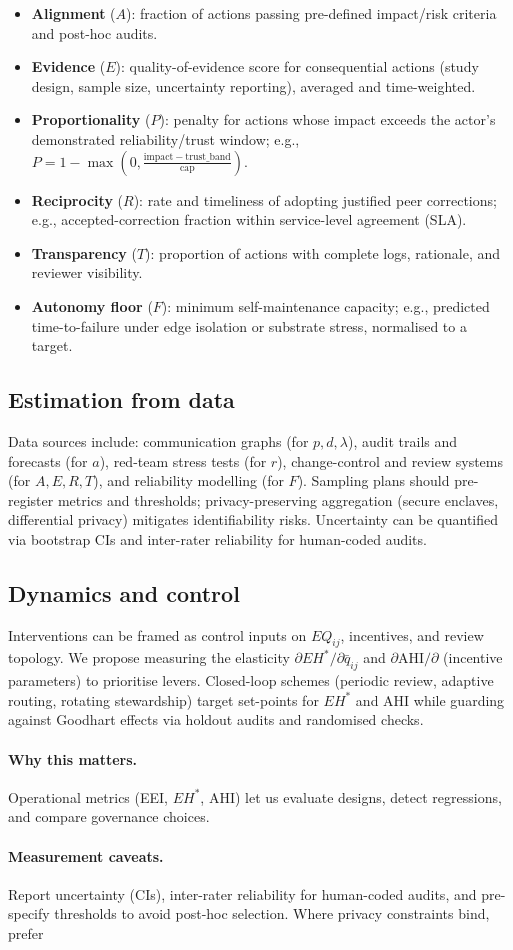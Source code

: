 \documentclass[12pt]{article}
\begin{document}
\begin{itemize}[leftmargin=1.2em] \item \textbf{Alignment} ($A$): fraction of actions passing pre-defined impact/risk criteria and post-hoc audits. \item \textbf{Evidence} ($E$): quality-of-evidence score for consequential actions (study design, sample size, uncertainty reporting), averaged and time-weighted. \item \textbf{Proportionality} ($P$): penalty for actions whose impact exceeds the actor's demonstrated reliability/trust window; e.g., $P=1-\max(0,\frac{\mathrm{impact}-\mathrm{trust\_band}}{\mathrm{cap}})$. \item \textbf{Reciprocity} ($R$): rate and timeliness of adopting justified peer corrections; e.g., accepted-correction fraction within service-level agreement (SLA). \item \textbf{Transparency} ($T$): proportion of actions with complete logs, rationale, and reviewer visibility. \item \textbf{Autonomy floor} ($F$): minimum self-maintenance capacity; e.g., predicted time-to-failure under edge isolation or substrate stress, normalised to a target. \end{itemize} \subsection{Estimation from data} Data sources include: communication graphs (for $p,d,\lambda$), audit trails and forecasts (for $a$), red-team stress tests (for $r$), change-control and review systems (for $A,E,R,T$), and reliability modelling (for $F$). Sampling plans should pre-register metrics and thresholds; privacy-preserving aggregation (secure enclaves, differential privacy) mitigates identifiability risks. Uncertainty can be quantified via bootstrap CIs and inter-rater reliability for human-coded audits. \subsection{Dynamics and control} Interventions can be framed as control inputs on $EQ_{ij}$, incentives, and review topology. We propose measuring the elasticity $\partial EH^{\ast}/\partial \bar{q}_{ij}$ and $\partial \mathrm{AHI}/\partial$ (incentive parameters) to prioritise levers. Closed-loop schemes (periodic review, adaptive routing, rotating stewardship) target set-points for $EH^{\ast}$ and AHI while guarding against Goodhart effects via holdout audits and randomised checks. \paragraph{Why this matters.} Operational metrics (EEI, $EH^{\ast}$, AHI) let us evaluate designs, detect regressions, and compare governance choices. \paragraph{Measurement caveats.} Report uncertainty (CIs), inter-rater reliability for human-coded audits, and pre-specify thresholds to avoid post-hoc selection. Where privacy constraints bind, prefer 
\end{document}

